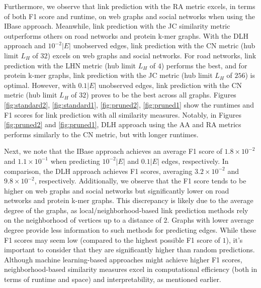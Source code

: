Furthermore, we observe that link prediction with the RA metric excels, in terms of both F1 score and runtime, on web graphs and social networks when using the IBase approach. Meanwhile, link prediction with the JC similarity metric outperforms others on road networks and protein k-mer graphs. With the DLH approach and $10^{-2}|E|$ unobserved edges, link prediction with the CN metric (hub limit $L_H$ of $32$) excels on web graphs and social networks. For road networks, link prediction with the LHN metric (hub limit $L_H$ of $4$) performs the best, and for protein k-mer graphs, link prediction with the JC metric (hub limit $L_H$ of $256$) is optimal. However, with $0.1|E|$ unobserved edges, link prediction with the CN metric (hub limit $L_H$ of $32$) proves to be the best across all graphs. Figures \ref{fig:standard2}, \ref{fig:standard1}, \ref{fig:pruned2}, \ref{fig:pruned1} show the runtimes and F1 scores for link prediction with all similarity measures. Notably, in Figures \ref{fig:pruned2} and \ref{fig:pruned1}, DLH approach using the AA and RA metrics performs similarly to the CN metric, but with longer runtimes.

Next, we note that the IBase approach achieves an average F1 score of $1.8\times10^{-2}$ and $1.1\times10^{-1}$ when predicting $10^{-2}|E|$ and $0.1|E|$ edges, respectively. In comparison, the DLH approach achieves F1 scores, averaging $3.2\times10^{-2}$ and $9.8\times10^{-2}$, respectively. Additionally, we observe that the F1 score tends to be higher on web graphs and social networks but significantly lower on road networks and protein k-mer graphs. This discrepancy is likely due to the average degree of the graphs, as local/neighborhood-based link prediction methods rely on the neighborhood of vertices up to a distance of $2$. Graphs with lower average degree provide less information to such methods for predicting edges. While these F1 scores may seem low (compared to the highest possible F1 score of $1$), it's important to consider that they are significantly higher than random predictions. Although machine learning-based approaches might achieve higher F1 scores, neighborhood-based similarity measures excel in computational efficiency (both in terms of runtime and space) and interpretability, as mentioned earlier.





